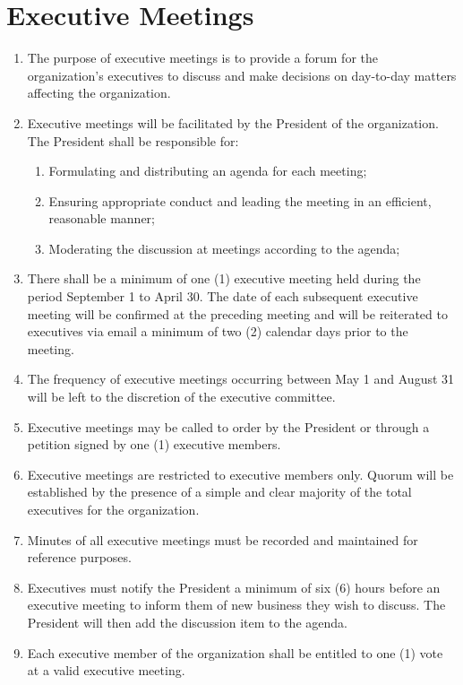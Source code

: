 \documentclass[12pt]{article}
\begin{document}
\section{Executive Meetings}
\begin{enumerate}[{8}.1]
    \item The purpose of executive meetings is to provide a forum for the organization’s executives to discuss and make decisions on day-to-day matters affecting the organization. 
    \item Executive meetings will be facilitated by the President of the organization. The President shall be responsible for:
    \begin{enumerate}[{8.2}.1]
        \item	Formulating and distributing an agenda for each meeting;
        \item	Ensuring appropriate conduct and leading the meeting in an efficient, reasonable manner;
        \item	Moderating the discussion at meetings according to the agenda;
    \end{enumerate}
    \item There shall be a minimum of one (1) executive meeting held during the period September 1 to April 30. The date of each subsequent executive meeting will be confirmed at the preceding meeting and will be reiterated to executives via email a minimum of two (2) calendar days prior to the meeting.
    \item The frequency of executive meetings occurring between May 1 and August 31 will be left to the discretion of the executive committee. 
    \item Executive meetings may be called to order by the President or through a petition signed by one (1) executive members. 
    \item Executive meetings are restricted to executive members only. Quorum will be established by the presence of a simple and clear majority of the total executives for the organization.
    \item Minutes of all executive meetings must be recorded and maintained for reference purposes.
    \item Executives must notify the President a minimum of six (6) hours before an executive meeting to inform them of new business they wish to discuss. The President will then add the discussion item to the agenda.
    \item Each executive member of the organization shall be entitled to one (1) vote at a valid executive meeting. 

\end{enumerate}
\end{document}
